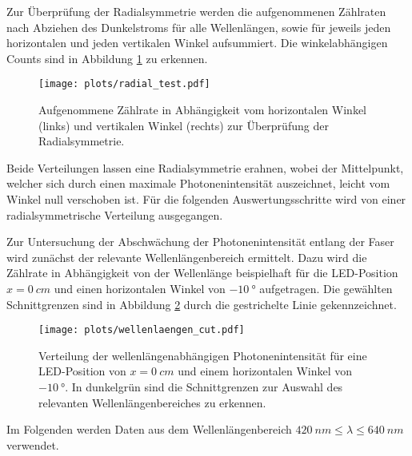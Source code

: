 Zur Überprüfung der Radialsymmetrie werden die aufgenommenen Zählraten nach Abziehen des Dunkelstroms für alle Wellenlängen, sowie für jeweils jeden horizontalen und jeden vertikalen Winkel aufsummiert. Die winkelabhängigen Counts sind in Abbildung \ref{fig:radial_test} zu erkennen. 
\begin{figure}
    \centering
    \texttt{[image: plots/radial\_test.pdf]}
    \caption{Aufgenommene Zählrate in Abhängigkeit vom horizontalen Winkel (links) und vertikalen Winkel (rechts) zur Überprüfung der Radialsymmetrie.}
    \label{fig:radial_test}
\end{figure}
\FloatBarrier
Beide Verteilungen lassen eine Radialsymmetrie erahnen, wobei der Mittelpunkt, welcher sich durch einen maximale Photonenintensität auszeichnet, leicht vom Winkel null verschoben ist. Für die folgenden Auswertungsschritte wird von einer radialsymmetrische Verteilung ausgegangen.


Zur Untersuchung der Abschwächung der Photonenintensität entlang der Faser wird zunächst der relevante Wellenlängenbereich ermittelt. Dazu wird die Zählrate in Abhängigkeit von der Wellenlänge beispielhaft für die LED-Position $x = \SI{0}{cm}$ und einen horizontalen Winkel von $\SI{-10}{°}$ aufgetragen. Die gewählten Schnittgrenzen sind in Abbildung \ref{fig:wellenlaengen_cut} durch die gestrichelte Linie gekennzeichnet.
\begin{figure}
    \centering
    \texttt{[image: plots/wellenlaengen\_cut.pdf]}
    \caption{Verteilung der wellenlängenabhängigen Photonenintensität für eine LED-Position von $x = \SI{0}{cm}$ und einem horizontalen Winkel von $\SI{-10}{°}$. In dunkelgrün sind die Schnittgrenzen zur Auswahl des relevanten Wellenlängenbereiches zu erkennen.}
    \label{fig:wellenlaengen_cut}
\end{figure}
\FloatBarrier
Im Folgenden werden Daten aus dem Wellenlängenbereich $\SI{420}{nm} \leq \lambda \leq \SI{640}{nm}$ verwendet.

